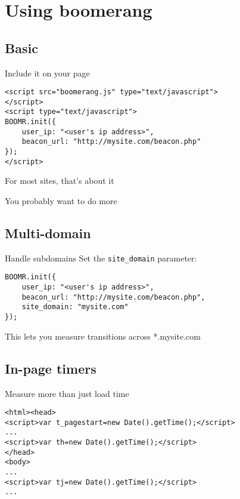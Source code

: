 \documentclass{beamer}
\begin{document}
\section{Using boomerang}
\label{sec:use}

\subsection{Basic}

\begin{frame}[fragile]{Include it on your page}
  \begin{verbatim}
<script src="boomerang.js" type="text/javascript">
</script>
<script type="text/javascript">
BOOMR.init({
    user_ip: "<user's ip address>",
    beacon_url: "http://mysite.com/beacon.php"
});
</script>
  \end{verbatim}
\end{frame}

\begin{frame}{}
  \begin{center}
  For most sites, that's about it
  \end{center}
\end{frame}

\begin{frame}{}
  \begin{center}
  You probably want to do more
  \end{center}
\end{frame}

\subsection{Multi-domain}
\begin{frame}[fragile]{Handle subdomains}
Set the \texttt{site\_domain} parameter:
\begin{verbatim}
BOOMR.init({
    user_ip: "<user's ip address>",
    beacon_url: "http://mysite.com/beacon.php",
    site_domain: "mysite.com"
});
\end{verbatim}
\end{frame}

\begin{frame}{}
\begin{center}
This lets you measure transitions across *.mysite.com
\end{center}
\end{frame}

\subsection{In-page timers}
\begin{frame}[fragile]{Measure more than just load time}
\begin{verbatim}
<html><head>
<script>var t_pagestart=new Date().getTime();</script>
...
<script>var th=new Date().getTime();</script>
</head>
<body>
...
<script>var tj=new Date().getTime();</script>
...
\end{verbatim}
\end{frame}
\end{document}
